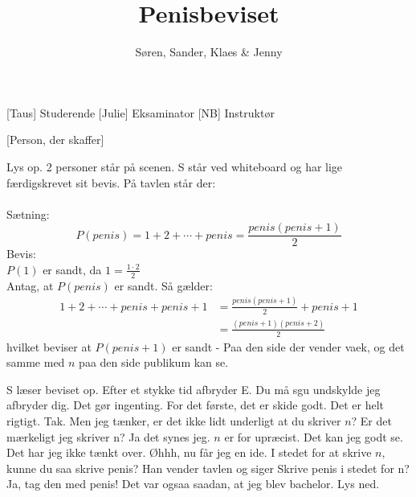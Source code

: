 \documentclass[a4paper,11pt]{article}
\title{Penisbeviset}
\author{Søren, Sander, Klaes \& Jenny}
\begin{document}
\maketitle

\begin{roles}
	[Taus] Studerende
	[Julie] Eksaminator
	[NB] Instruktør
\end{roles}

\begin{props}
	[Person, der skaffer]
\end{props}

\begin{sketch}

\scene Lys op. 2 personer står på scenen. S står ved whiteboard og har lige færdigskrevet sit bevis. På tavlen står der:\\\\
Sætning:
$$ P(penis) = 1 + 2 + \cdots + penis = \frac{penis(penis + 1)}{2} $$
Bevis:\\
\indent $P(1)$ er sandt, da $1 = \frac{1 \cdot 2}{2}$\\
\indent Antag, at $P(penis)$ er sandt. Så gælder:
$$
\begin{array}{ll}
	1 + 2 + \cdots + penis + penis + 1 & = \frac{penis(penis + 1)}{2} + penis + 1 \\
	& = \frac{(penis + 1)(penis + 2)}{2}
\end{array}
$$
hvilket beviser at $P(penis + 1)$ er sandt - Paa den side der vender vaek, og det samme med $n$ paa den side publikum kan se.

\scene S læser beviset op. Efter et stykke tid afbryder E.
 Du må sgu undskylde jeg afbryder dig.
 Det gør ingenting.
 For det første, det er skide godt. Det er helt rigtigt.
 Tak.
 Men jeg tænker, er det ikke lidt underligt at du skriver $n$?
 Er det mærkeligt jeg skriver n?
 Ja det synes jeg. $n$ er for upræcist.
 Det kan jeg godt se. Det har jeg ikke tænkt over.
 Øhhh, nu får jeg en ide. I stedet for at skrive $n$, kunne du saa skrive penis?
\scene Han vender tavlen og siger
 Skrive penis i stedet for n?
 Ja, tag den med penis!
 Det var ogsaa saadan, at jeg blev bachelor.
\scene Lys ned.

\end{sketch}
\end{document}
